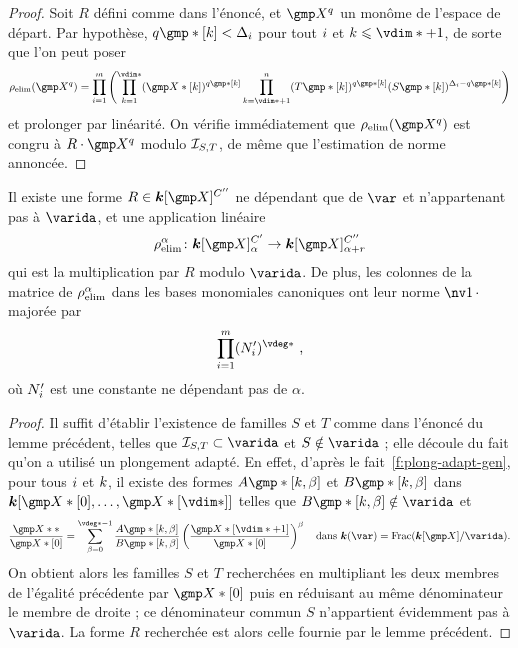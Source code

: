 \begin{proof}
  Soit \( R \) défini comme dans l'énoncé, et \( \vmp^q \) un monôme de
  l'espace de départ. Par hypothèse, \( q\mexp*[\ind] < \Delta_\fct \) pour
  tout \( i \) et \( \ind \le \vdim* + 1 \), de sorte que l'on peut poser
  \begin{equation}
    \relim( \vmp^q )
    =
    \prod\fctrange \left(
    \prod_{\ind=1}^{\vdim*}
    (\vmp*[\ind])^{q\mexp*[\ind]}
    \prod_{\ind=\vdim*+1}^\dimp
    (T\mexp*[\ind])^{q\mexp*[\ind]}
    (S\mexp*[\ind])^{\Delta_\fct - q\mexp*[\ind]}
    \right)
  \end{equation}
  et prolonger par linéarité. On vérifie immédiatement que \( \relim(\vmp^q)
  \) est congru à \( R \cdot \vmp^q \) modulo \( \mathcal I_{S, T} \), de même
  que l'estimation de norme annoncée.
\end{proof}

\begin{coro} \label{c:hmat-relim}
  Il existe une forme \( R \in \cdn [\vmp]^{C''} \) ne dépendant que de \(
    \var \) et n'appartenant pas à \( \varida \), et une application linéaire
  \begin{equation}
    \relim^\alpha \colon
    \cdn [\vmp]_{\alpha}^{C'}
    \to
    \cdn [\vmp]_{\alpha+r}^{C''}
  \end{equation}
  qui est la multiplication par \( R \) modulo \( \varida \).  De plus, les
  colonnes de la matrice de \( \rho\sb{\mathrm{elim}}^\alpha \) dans les bases monomiales
  canoniques ont leur norme \( \nv1\truc \) majorée par
  \begin{equation}
    \prod\fctrange
    (N'_\fct)^{\vdeg*}
    \pmm,
  \end{equation}
  où \( N'_i \) est une constante ne dépendant pas de \( \alpha \).
\end{coro}

\begin{proof}
  Il suffit d'établir l'existence de familles \( S \) et \( T \) comme dans
  l'énoncé du lemme précédent, telles que \( \Ideal_{S, T} \subset \varida \)
  et \( S \notin \varida \) ;
  elle découle du fait qu'on a utilisé un plongement adapté.
  En effet, d'après le fait~\vref{f:plong-adapt-gen}, pour tous \( i \) et
  \( k \), il existe des formes \( A\mexp*[\ind, \beta] \) et \(
    B\mexp*[\ind, \beta] \) dans
  \( \cdn [ \vmp*[0], \dots, \vmp*[\vdim*] ] \) telles que \(
    B\mexp*[\ind, \beta] \notin \varida \) et
  \begin{equation}
    \frac{ \vmp** }{ \vmp*[0] }
    =
    \sum_{\beta = 0}^{\vdeg* - 1}
    \frac {A\mexp*[\ind, \beta]} {B\mexp*[\ind, \beta]}
    \left( \frac{ \vmp*[\vdim* + 1] }{ \vmp*[0] } \right) ^\beta
    \quad\text{dans \( \cdn(\var) = \mathrm{Frac}( \cdn[\vmp] / \varida ) \).}
  \end{equation}
  On obtient alors les familles \( S \) et \( T \) recherchées en multipliant
  les deux membres de l'égalité précédente par \( \vmp*[0] \) puis en
  réduisant au même dénominateur le membre de droite ; ce dénominateur commun
  \( S \) n'appartient évidemment pas à \( \varida \). La forme \( R \)
  recherchée est alors celle fournie par le lemme précédent.
\end{proof}


